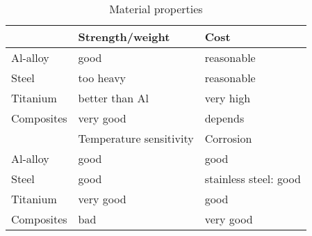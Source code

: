 \documentclass[10pt, twocolumn]{article}
\begin{document}
\begin{table}[ht] %
  \caption{Material properties}
  \begin{center}
    \centering %
    \begin{tabular}{ %
      l|p{2.5cm}|l
      }

                 & Strength/weight         & Cost                  \\ \hline\hline
      Al-alloy   & good                    & reasonable            \\ \hline
      Steel      & too heavy               & reasonable            \\ \hline
      Titanium   & better than Al          & very high             \\ \hline
      Composites & very good               & depends               \\ \hline\hline
                 & Temperature sensitivity & Corrosion             \\ \hline\hline
      Al-alloy   & good                    & good                  \\ \hline
      Steel      & good                    & stainless steel: good \\ \hline
      Titanium   & very good               & good                  \\ \hline
      Composites & bad                     & very good             \\
    \end{tabular}
  \end{center}
\end{table}
\end{document}

